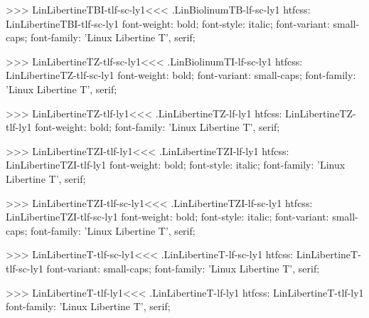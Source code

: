 {{{>>>
\<LinLibertineTBI-tlf-sc-ly1\><<<
.LinBiolinumTB-lf-sc-ly1
htfcss:  LinLibertineTBI-tlf-sc-ly1  font-weight: bold; font-style: italic; font-variant: small-caps; font-family: 'Linux Libertine T', serif;

>>>
\<LinLibertineTZ-tlf-sc-ly1\><<<
.LinBiolinumTI-lf-sc-ly1
htfcss:  LinLibertineTZ-tlf-sc-ly1  font-weight: bold; font-variant: small-caps; font-family: 'Linux Libertine T', serif;

>>>
\<LinLibertineTZ-tlf-ly1\><<<
.LinLibertineTZ-lf-ly1
htfcss:  LinLibertineTZ-tlf-ly1  font-weight: bold; font-family: 'Linux Libertine T', serif;

>>>
\<LinLibertineTZI-tlf-ly1\><<<
.LinLibertineTZI-lf-ly1
htfcss:  LinLibertineTZI-tlf-ly1  font-weight: bold; font-style: italic; font-family: 'Linux Libertine T', serif;

>>>
\<LinLibertineTZI-tlf-sc-ly1\><<<
.LinLibertineTZI-lf-sc-ly1
htfcss:  LinLibertineTZI-tlf-sc-ly1  font-weight: bold; font-style: italic; font-variant: small-caps; font-family: 'Linux Libertine T', serif;

>>>
\<LinLibertineT-tlf-sc-ly1\><<<
.LinLibertineT-lf-sc-ly1
htfcss:  LinLibertineT-tlf-sc-ly1  font-variant: small-caps; font-family: 'Linux Libertine T', serif;

>>>
\<LinLibertineT-tlf-ly1\><<<
.LinLibertineT-lf-ly1
htfcss:  LinLibertineT-tlf-ly1  font-family: 'Linux Libertine T', serif;

}}}
